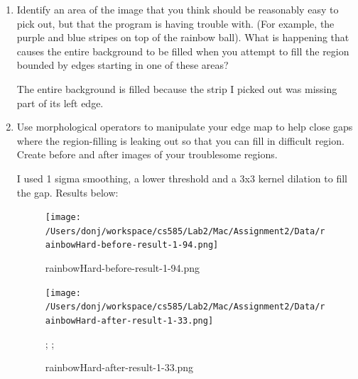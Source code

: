 \documentclass{article}
\begin{document}
\begin{enumerate}
\item
Identify an area of the image that you think should be reasonably easy to pick out, but that the program is having trouble with. (For example, the purple and blue stripes on top of the rainbow ball). What is happening that causes the entire background to be filled when you attempt to fill the region bounded by edges starting in one of these areas?

The entire background is filled because the strip I picked out was missing part of its left edge.

\item
Use morphological operators to manipulate your edge map to help close gaps where the region-filling is leaking out so that you can fill in difficult region. Create before and after images of your troublesome regions. 

I used 1 sigma smoothing, a lower threshold and  a 3x3 kernel dilation to fill the gap. Results below:

\begin{figure}[H]
\centering
\texttt{[image: /Users/donj/workspace/cs585/Lab2/Mac/Assignment2/Data/rainbowHard-before-result-1-94.png]}
\caption{rainbowHard-before-result-1-94.png}
\label{overflow}
\end{figure}

\begin{figure}[H]
\centering
\texttt{[image: /Users/donj/workspace/cs585/Lab2/Mac/Assignment2/Data/rainbowHard-after-result-1-33.png]}
\caption{rainbowHard-after-result-1-33.png}
;\label{overflow}
;\end{figure}

\end{enumerate}
\end{document}

